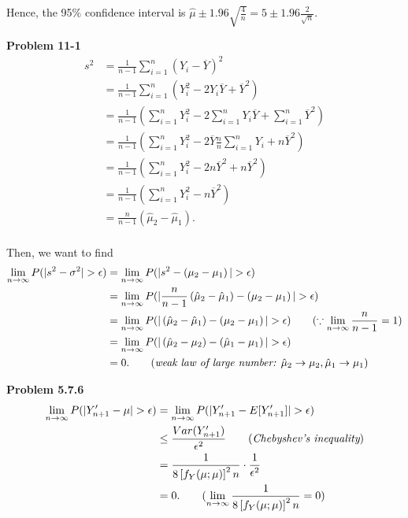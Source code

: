 \documentclass{article}
\begin{document}
Hence, the 95\% confidence interval is $\hat{\mu}\pm 1.96\sqrt{\frac{4}{n}} = 5\pm 1.96\frac{2}{\sqrt{n}}$.
\bigbreak

\textbf{Problem 11-1}
\begin{align*}
    s^2 & = \frac{1}{n-1}\sum_{i=1}^{n}(Y_i - \overline{Y})^2 \\
    & = \frac{1}{n-1}\sum_{i=1}^{n}(Y_i^2 - 2Y_i\overline{Y} + \overline{Y}^2) \\
    & = \frac{1}{n-1}\left(\sum_{i=1}^{n}Y_i^2 - 2\sum_{i=1}^{n}Y_i\overline{Y} + \sum_{i=1}^{n}\overline{Y}^2\right) \\
    & = \frac{1}{n-1}\left(\sum_{i=1}^{n}Y_i^2 - 2\overline{Y}\frac{n}{n}\sum_{i=1}^{n}Y_i+ n\overline{Y}^2\right) \\
    & = \frac{1}{n-1}\left(\sum_{i=1}^{n}Y_i^2 - 2n\overline{Y}^2+ n\overline{Y}^2\right) \\
    & = \frac{1}{n-1}\left(\sum_{i=1}^{n}Y_i^2 - n\overline{Y}^2\right) \\
    & = \frac{n}{n-1}\left(\hat{\mu}_2-\hat{\mu}_1\right). \\
\end{align*}

Then, we want to find 
\begin{align*}
    \lim_{n\rightarrow\infty}P(|s^2 - \sigma^2| > \epsilon) & = \lim_{n\rightarrow\infty}P(|s^2 - \left(\mu_2-\mu_1\right)| > \epsilon) \\
    & = \lim_{n\rightarrow\infty}P(|\frac{n}{n-1}\left(\hat{\mu}_2-\hat{\mu}_1\right) - \left(\mu_2-\mu_1\right)| > \epsilon) \\
    & = \lim_{n\rightarrow\infty}P(|\left(\hat{\mu}_2-\hat{\mu}_1\right) - \left(\mu_2-\mu_1\right)| > \epsilon) \qquad (\because \lim_{n\rightarrow\infty}\frac{n}{n-1}=1) \\
    & = \lim_{n\rightarrow\infty}P(|\left(\hat{\mu}_2-\mu_2\right) - \left(\hat{\mu}_1-\mu_1\right)| > \epsilon) \\
    & = 0. \qquad (\emph{weak law of large number: }\hat{\mu}_2 \rightarrow \mu_2, \hat{\mu}_1 \rightarrow \mu_1)
\end{align*}
\pagebreak

\textbf{Problem 5.7.6}
\begin{align*}
    \lim_{n\rightarrow\infty}P(|Y'_{n+1} - \mu| > \epsilon) & = \lim_{n\rightarrow\infty}P(|Y'_{n+1} - E[Y'_{n+1}]| > \epsilon) \\
    & \le \frac{Var(Y'_{n+1})}{\epsilon^2} \qquad (\emph{Chebyshev's inequality}) \\
    & = \frac{1}{8\left[f_Y(\mu;\mu)\right]^2n}\cdot \frac{1}{\epsilon^2} \\
    & = 0. \qquad (\lim_{n\rightarrow\infty}\frac{1}{8\left[f_Y(\mu;\mu)\right]^2n} = 0)
\end{align*}
\bigbreak
\end{document}
